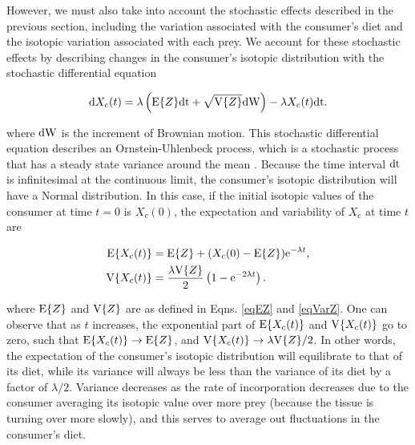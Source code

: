 \documentclass{article}
\begin{document}

However, we must also take into account the stochastic effects described in the previous section, including the variation associated with the consumer's diet and the isotopic variation associated with each prey.
We account for these stochastic effects by describing changes in the consumer's isotopic distribution with the stochastic differential equation

\begin{equation}
\label{eqSDE}
{\rm d}X_c(t) = \lambda\left({\rm E}\{Z\}{\rm dt} + \sqrt{{\rm V}\{Z\}}{\rm dW}\right) - \lambda X_c(t){\rm dt}.
\end{equation}

\noindent where ${\rm dW}$ is the increment of Brownian motion.
This stochastic differential equation describes an Ornstein-Uhlenbeck process, which is a stochastic process that has a steady state variance around the mean \citep{Mangel:2006wa}.
Because the time interval ${\rm dt}$ is infinitesimal at the continuous limit, the consumer's isotopic distribution will have a Normal distribution.
In this case, if the initial isotopic values of the consumer at time $t=0$ is $X_c(0)$, the expectation and variability of $X_c$ at time $t$ are

\begin{align}
  \begin{split}
    \label{eqEVar}
{\rm E}\{X_c(t)\} &= {\rm E}\{Z\} + (X_c(0) - {\rm E}\{Z\}){\rm e}^{-\lambda t},\\
{\rm V}\{X_c(t)\} &= \frac{\lambda {\rm V}\{Z\}}{2}\left(1 - {\rm e}^{-2\lambda t}\right).
\end{split}
\end{align}

\noindent where ${\rm E}\{Z\}$ and ${\rm V}\{Z\}$ are as defined in Eqns. \ref{eqEZ} and \ref{eqVarZ}.
One can observe that as $t$ increases, the exponential part of ${\rm E}\{X_c(t)\}$ and ${\rm V}\{X_c(t)\}$ go to zero, such that ${\rm E}\{X_c(t)\} \to {\rm E}\{Z\}$, and ${\rm V}\{X_c(t)\} \to \lambda{\rm V}\{Z\}/2$.
In other words, the expectation of the consumer's isotopic distribution will equilibrate to that of its diet, while its variance will always be less than the variance of its diet by a factor of $\lambda/2$.
Variance decreases as the rate of incorporation decreases due to the consumer averaging its isotopic value over more prey (because the tissue is turning over more slowly), and this serves to average out fluctuations in the consumer's diet.
\end{document}
